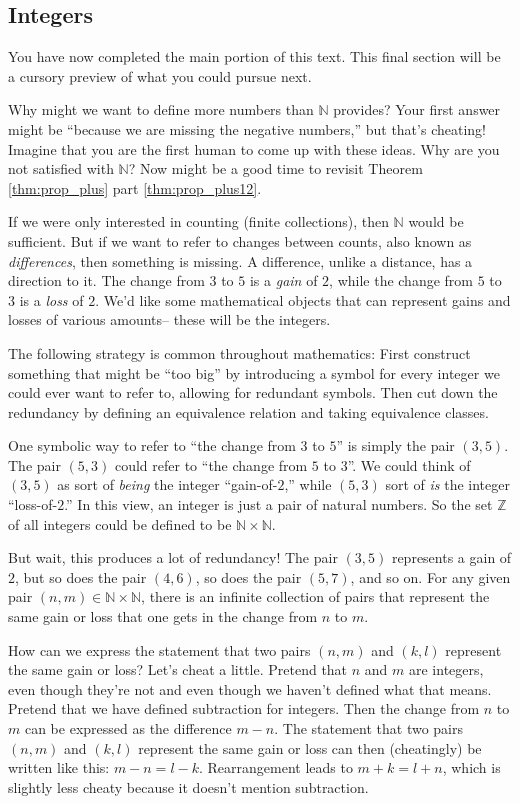 \documentclass[12pt]{article}
\def\N{\mathbb{N}}
\def\Z{\mathbb{Z}}
\begin{document}
\subsection{Integers}

You have now completed the main portion of this text.
This final section will be a cursory preview of
what you could pursue next.


Why might we want to define more numbers than $\N$ provides?
Your first answer might be ``because we are missing the negative numbers,''
but that's cheating! Imagine that you are the first human to come up with these ideas. Why
are you not satisfied with $\N$? Now might be a good time to revisit Theorem
\ref{thm:prop_plus} part \ref{thm:prop_plus12}.

If we were only interested in counting (finite collections), then $\N$ would be sufficient.
But if we want to refer to changes between counts, also
known as \emph{differences}, then something is missing. A difference, unlike a distance, has a direction to it.
The change from $3$ to $5$ is a \emph{gain} of $2$, while the change from $5$ to $3$ is a \emph{loss} of $2$.
We'd like some mathematical objects that can represent gains and losses of various amounts-- these will be the integers.

The following strategy is common throughout mathematics:
First construct something that might be ``too big'' by introducing a symbol
for every integer we could ever want to refer to,
allowing for redundant symbols.
Then cut down the redundancy by defining an equivalence relation and taking equivalence classes.

One symbolic way to refer to ``the change from $3$ to $5$''
is simply the pair $(3,5)$.
The pair $(5,3)$ could refer to ``the change from $5$ to $3$''.
We could think of $(3,5)$ as sort of \emph{being} the integer ``gain-of-$2$,''
while $(5,3)$ sort of \emph{is} the integer ``loss-of-$2$.''
In this view, an integer is just a pair of natural numbers. So the set $\Z$ of all integers could
be defined to be $\N\times\N$.

But wait, this produces a lot of redundancy!
The pair $(3,5)$ represents a gain of $2$, but so does the pair $(4,6)$,
so does the pair $(5,7)$, and so on.
For any given pair $(n,m)\in\N\times\N$, there is an infinite collection of pairs
that represent the same gain or loss that one gets in the change from $n$ to $m$.

How can we express the statement that two pairs $(n,m)$ and $(k,l)$ represent the same gain or loss?
Let's cheat a little. Pretend that $n$ and $m$ are integers,
even though they're not and even though we haven't defined what that means.
Pretend that we have defined subtraction for integers.
Then the change from $n$ to $m$ can be expressed as the difference $m-n$.
The statement that two pairs $(n,m)$ and $(k,l)$ represent the same gain or loss
can then (cheatingly) be written like this: $m-n = l-k$.
Rearrangement leads to $m+k=l+n$, which is slightly less cheaty because it doesn't mention subtraction.
\end{document}
